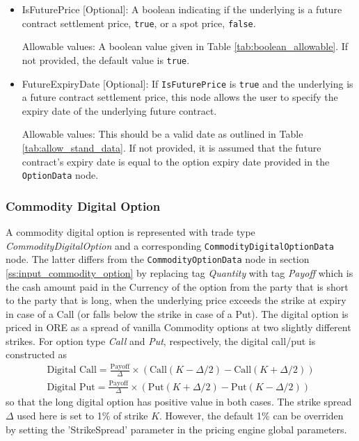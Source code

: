 \begin{itemize}
\item IsFuturePrice [Optional]: A boolean indicating if the underlying is a future contract settlement price, \lstinline!true!, or a spot price, \lstinline!false!.

Allowable values: A boolean value given in Table \ref{tab:boolean_allowable}. If not provided, the default value is \lstinline!true!.

\item FutureExpiryDate [Optional]: If \lstinline!IsFuturePrice! is \lstinline!true! and the underlying is a future contract settlement price, this node allows the user to specify the expiry date of the underlying future contract.

Allowable values: This should be a valid date as outlined in Table \ref{tab:allow_stand_data}. If not provided, it is assumed that the future contract's expiry date is equal to the option expiry date provided in the \lstinline!OptionData! node.
\end{itemize}


\subsubsection{Commodity Digital Option}
\label{ss:input_commodity_digital_option}

A commodity digital option is represented with trade type  \emph{CommodityDigitalOption} and a corresponding
\lstinline!CommodityDigitalOptionData! node.
The latter differs from the \lstinline!CommodityOptionData! node in section \ref{ss:input_commodity_option} by replacing tag \emph{Quantity}
with tag \emph{Payoff} which is the cash amount paid in the Currency of the option from the party that is short to the party that is long, when the underlying price exceeds the strike at expiry in case of a Call (or falls below the strike in case of a Put). The digital option is priced in ORE as a spread of vanilla Commodity options at two slightly different strikes. For option type \emph{Call}
and \emph{Put}, respectively, the digital call/put is constructed as
\begin{align*}
\mbox{Digital Call} =  \frac{\mbox{Payoff}}{\Delta}  \times  \left( \mbox{Call}(K- \Delta/2) - \mbox{Call}(K+ \Delta/2) \right) \\
\mbox{Digital Put} = \frac{\mbox{Payoff}}{\Delta}  \times \left( \mbox{Put}(K+ \Delta/2) - \mbox{Put}(K- \Delta/2)  \right)
\end{align*}
so that the long digital option has positive value in both cases. The strike spread $\Delta$ used here is set to 1\% of strike $K$. However, the default 1\% can be overriden by setting the 'StrikeSpread' parameter in the pricing engine global parameters.

